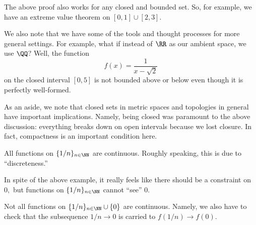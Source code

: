 \documentclass[../notes.tex]{subfiles}
\begin{document}
\begin{remark}
	The above proof also works for any closed and bounded set. So, for example, we have an extreme value theorem on $[0,1]\cup[2,3].$
\end{remark}
We also note that we have some of the tools and thought processes for more general settings. For example, what if instead of $\RR$ as our ambient space, we use $\QQ$? Well, the function
\[f(x)=\frac1{x-\sqrt2}\]
on the closed interval $[0,5]$ is not bounded above or below even though it is perfectly well-formed.

As an aside, we note that closed sets in metric spaces and topologies in general have important implications. Namely, being closed was paramount to the above discussion: everything breaks down on open intervals because we lost closure. In fact, compactness is an important condition here.
\begin{example}
	All functions on $\{1/n\}_{n\in\NN}$ are continuous. Roughly speaking, this is due to ``discreteness.''
\end{example}
In spite of the above example, it really feels like there should be a constraint on $0,$ but functions on $\{1/n\}_{n\in\NN}$ cannot ``see'' $0.$
\begin{example}
	Not all functions on $\{1/n\}_{n\in\NN}\cup\{0\}$ are continuous. Namely, we also have to check that the subsequence $1/n\to0$ is carried to $f(1/n)\to f(0).$
\end{example}
\end{document}
